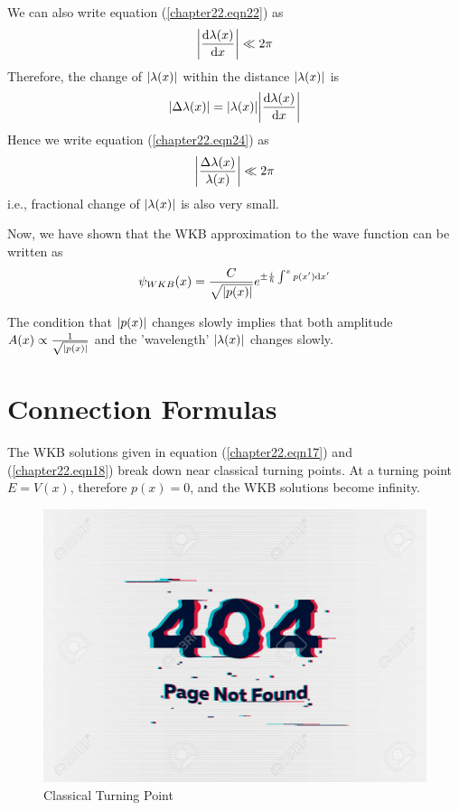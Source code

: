 We can also write equation (\ref{chapter22.eqn22}) as
\begin{equation}
\label{chapter22.eqn24}
\abs{\dv{\lambda(x)}{x}} \ll 2 \pi
\end{equation}
Therefore, the change of $\abs{\lambda(x)}$ within the distance $\abs{\lambda(x)}$ is
\begin{equation}
\abs{\Delta \lambda(x)} = \abs{\lambda(x)} \abs{\dv{\lambda(x)}{x}}
\end{equation}
Hence we write equation (\ref{chapter22.eqn24}) as
\begin{equation}
	\label{chapter22.eqn25}
	\abs{\frac{\Delta \lambda(x)}{\lambda(x)}} \ll 2 \pi
\end{equation}
i.e., fractional change of $\abs{\lambda(x)}$ is also very small.

Now, we have shown that the WKB approximation to the wave function can be written as
\begin{equation}
\psi_{WKB}(x) = \frac{C}{\sqrt{\abs{p(x)}}} e^{\pm \frac{{i\mkern1mu}}{\hbar} \int^{x} p(x^\prime) \dd{x^\prime}}
\end{equation}

The condition that $\abs{p(x)}$ changes slowly implies that both amplitude $A(x) \propto \frac{1}{\sqrt{\abs{p(x)}}}$ and the 'wavelength'  $\abs{\lambda(x)}$ changes slowly.




\section{Connection Formulas}

The WKB solutions given in equation (\ref{chapter22.eqn17}) and (\ref{chapter22.eqn18}) break down near classical turning points. At a turning point $E=V(x)$, therefore $p(x)=0$, and the WKB solutions become infinity.

\begin{figure}
	\centering
	\includegraphics[width=0.5\linewidth]{Pictures/not-found.jpg}
	\caption{Classical Turning Point}
	\label{chapter22.fig1}
\end{figure}

